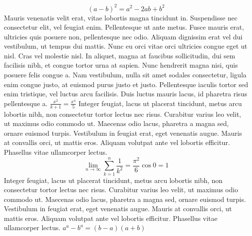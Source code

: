 \documentclass{article}
\begin{document}
\begin{equation}
(a-b)^{2}=a^{2}-2ab+b^{2}
\end{equation}
Mauris venenatis velit erat, vitae lobortis magna tincidunt in. Suspendisse nec consectetur elit, vel feugiat enim. Pellentesque ut ante metus. Fusce mauris erat, ultricies quis posuere non, pellentesque nec odio. Aliquam dignissim erat vel dui vestibulum, ut tempus dui mattis. Nunc eu orci vitae orci ultricies congue eget ut nisl. Cras vel molestie nisl. In aliquet, magna at faucibus sollicitudin, dui sem facilisis nibh, et congue tortor urna at sapien.
Nunc hendrerit magna nisi, quis posuere felis congue a. Nam vestibulum, nulla sit amet sodales consectetur, ligula enim congue justo, at euismod purus justo et justo. Pellentesque iaculis tortor sed enim tristique, vel luctus arcu facilisis. Duis luctus mauris lacus, id pharetra risus pellentesque a.
$\frac{ x^{2} }{ k+1 } = \frac{ x^{4} }{ 5 }$
 Integer feugiat, lacus ut placerat tincidunt, metus arcu lobortis nibh, non consectetur tortor lectus nec risus. Curabitur varius leo velit, ut maximus odio commodo ut. Maecenas odio lacus, pharetra a magna sed, ornare euismod turpis. Vestibulum in feugiat erat, eget venenatis augue. Mauris at convallis orci, ut mattis eros. Aliquam volutpat ante vel lobortis efficitur. Phasellus vitae ullamcorper lectus.
$$
\lim_{n \to \infty}
\sum_{k=1}^n \frac{1}{k^2}
= \frac{\pi^2}{6} \cos{0} = 1
$$
 Integer feugiat, lacus ut placerat tincidunt, metus arcu lobortis nibh, non consectetur tortor lectus nec risus. Curabitur varius leo velit, ut maximus odio commodo ut. Maecenas odio lacus, pharetra a magna sed, ornare euismod turpis. Vestibulum in feugiat erat, eget venenatis augue. Mauris at convallis orci, ut mattis eros. Aliquam volutpat ante vel lobortis efficitur. Phasellus vitae ullamcorper lectus.
\begin{math}
    a^{a}-b^{a} = (b - a)(a + b)
\end{math}
\end{document}
